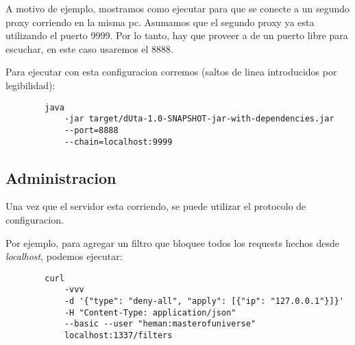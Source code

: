 \documentclass[11pt,a4paper,titlepage]{article}
\begin{document}
    A motivo de ejemplo, mostramos como ejecutar \duta para que se conecte a un segundo proxy corriendo en la misma pc.
    Asumamos que el segundo proxy ya esta utilizando el puerto 9999.
    Por lo tanto, hay que proveer a \duta de un puerto libre para escuchar, en este caso usaremos el 8888.

    Para ejecutar con esta configuracion corremos (saltos de linea introducidos por legibilidad):
    \begin{verbatim}
        java 
            -jar target/dUta-1.0-SNAPSHOT-jar-with-dependencies.jar 
            --port=8888 
            --chain=localhost:9999
    \end{verbatim}

    \subsection{Administracion}
    Una vez que el servidor esta corriendo, se puede utilizar el protocolo de configuracion.

    Por ejemplo, para agregar un filtro que bloquee todos los requests hechos desde \textit{localhost}, podemos ejecutar:
    \begin{verbatim}
        curl 
            -vvv 
            -d '{"type": "deny-all", "apply": [{"ip": "127.0.0.1"}]}' 
            -H "Content-Type: application/json" 
            --basic --user "heman:masterofuniverse" 
            localhost:1337/filters
    \end{verbatim}


\end{document}
